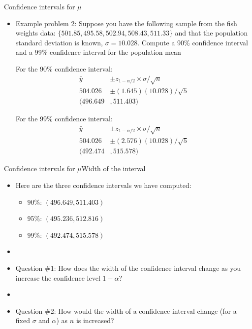 \documentclass[xcolor=dvipsnames]{beamer}
\begin{document}
\begin{frame}{Confidence intervals for $\mu$}
	\begin{itemize}
		\item Example problem 2: Suppose you have the following sample from the fish weights data: $\{501.85, 495.58, 502.94, 508.43, 511.33 \}$ and that the population standard deviation is known, $\sigma = 10.028$. Compute a 90\% confidence interval and a 99\% confidence interval for the population mean\\  \vspace{8pt}
		
		For the 90\% confidence interval: 
		\begin{align*}
			\bar{y} &\pm z_{1-\alpha / 2} \times \sigma / \sqrt{n} \\
			504.026 &\pm (1.645)(10.028)/\sqrt{5} \\
			(496.649&, 511.403)
		\end{align*}  \pause
		
		For the 99\% confidence interval: 
		\begin{align*}
		\bar{y} &\pm z_{1-\alpha / 2} \times \sigma / \sqrt{n} \\
		504.026 &\pm (2.576)(10.028)/\sqrt{5} \\
		(492.474&, 515.578)
		\end{align*}
		
	\end{itemize}
\end{frame}

\begin{frame}{Confidence intervals for $\mu$}{Width of the interval}
	\begin{itemize}
		\item Here are the three confidence intervals we have computed:
		\begin{itemize}
			\item 90\%: $(496.649, 511.403)$
			\item 95\%: $(495.236, 512.816)$
			\item 99\%: $(492.474, 515.578)$
		\end{itemize}  \pause
	\item[]
	\item Question \#1: How does the width of the confidence interval change as you increase the confidence level $1-\alpha$?  \pause
	\item[]
	\item Question \#2: How would the width of a confidence interval change (for a fixed $\sigma$ and $\alpha$) as $n$ is increased?
	\end{itemize}
\end{frame}
\end{document}
